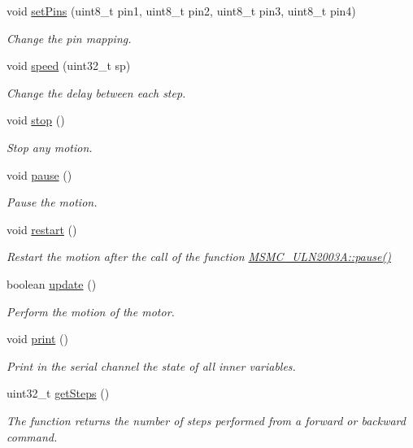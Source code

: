 \begin{DoxyCompactItemize}
void \hyperlink{class_m_s_m_c___u_l_n2003_a_a19320fa4543dd8e76e338737690df235}{set\+Pins} (uint8\+\_\+t pin1, uint8\+\_\+t pin2, uint8\+\_\+t pin3, uint8\+\_\+t pin4)
\begin{DoxyCompactList}\small\item\em Change the pin mapping. \end{DoxyCompactList}\item 
void \hyperlink{class_m_s_m_c___u_l_n2003_a_ad8df164c90b2205fb65c796632889f82}{speed} (uint32\+\_\+t sp)
\begin{DoxyCompactList}\small\item\em Change the delay between each step. \end{DoxyCompactList}\item 
void \hyperlink{class_m_s_m_c___u_l_n2003_a_aba5e18f20f31fd4d6e71f50821dfeee5}{stop} ()
\begin{DoxyCompactList}\small\item\em Stop any motion. \end{DoxyCompactList}\item 
void \hyperlink{class_m_s_m_c___u_l_n2003_a_aa1d3444465d59ca6c87f05f565dde4a2}{pause} ()
\begin{DoxyCompactList}\small\item\em Pause the motion. \end{DoxyCompactList}\item 
void \hyperlink{class_m_s_m_c___u_l_n2003_a_a19853d77f81c521091a55996899c1784}{restart} ()
\begin{DoxyCompactList}\small\item\em Restart the motion after the call of the function \hyperlink{class_m_s_m_c___u_l_n2003_a_aa1d3444465d59ca6c87f05f565dde4a2}{M\+S\+M\+C\+\_\+\+U\+L\+N2003\+A\+::pause()} \end{DoxyCompactList}\item 
boolean \hyperlink{class_m_s_m_c___u_l_n2003_a_acdf6b6224352a90146e67ee9837d0a6f}{update} ()
\begin{DoxyCompactList}\small\item\em Perform the motion of the motor. \end{DoxyCompactList}\item 
void \hyperlink{class_m_s_m_c___u_l_n2003_a_aa6743162bdaba01ef1fc8a79f2519897}{print} ()
\begin{DoxyCompactList}\small\item\em Print in the serial channel the state of all inner variables. \end{DoxyCompactList}\item 
uint32\+\_\+t \hyperlink{class_m_s_m_c___u_l_n2003_a_a06c602281da9eebbd38dc4151c137609}{get\+Steps} ()
\begin{DoxyCompactList}\small\item\em The function returns the number of steps performed from a forward or backward command. \end{DoxyCompactList}\end{DoxyCompactItemize}
